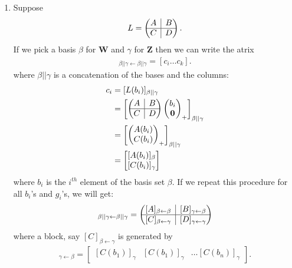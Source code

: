 \documentclass{book}
\theoremstyle{definition}
\newcommand{\W}{\mathbf{W}}
\newcommand{\Z}{\mathbf{Z}}
\newcommand{\rvline}{\hspace*{-\arraycolsep}\vline\hspace*{-\arraycolsep}}
\begin{document}
\begin{enumerate}
	
	\item Suppose 
	\begin{align*}
	L = \begin{pmatrix}
	A & \rvline & B\\
	\hline
	C & \rvline & D
	\end{pmatrix}.
	\end{align*}
	If we pick a basis $\beta$ for $\W$ and $\gamma$ for $\Z$ then we can write the atrix
	\begin{align*}
	[L]_{\beta||\gamma \leftarrow \beta||\gamma} = [c_i \dots c_k].
	\end{align*}
	where $\beta||\gamma$ is a concatenation of the bases and the columns:
	\begin{align*}
	c_i &= [L(b_i)]_{\beta||\gamma}\\
	&= \begin{bmatrix}
	\begin{pmatrix}
	A & \rvline & B\\
	\hline
	C & \rvline & D
	\end{pmatrix} \begin{pmatrix}
	b_i \\ \mathbf{0}
	\end{pmatrix}_+
	\end{bmatrix}_{\beta||\gamma} \\
	&= \begin{bmatrix}
	\begin{pmatrix}
	A(b_i)\\
	C(b_i)
	\end{pmatrix}_+
	\end{bmatrix}_{\beta||\gamma}\\
	&= \begin{bmatrix}
	[A(b_i)]_\beta\\
	[C(b_i)]_\gamma
	\end{bmatrix}
	\end{align*}
	where $b_i$ is the $i^{th}$ element of the basis set $\beta$. If we repeat this procedure for all $b_i$'s and $g_i$'s, we will get:
	\begin{align*}
	[L]_{\beta||\gamma \leftarrow \beta||\gamma} = 
	\begin{pmatrix}
	[A]_{\beta\leftarrow \beta} & \rvline & [B]_{\gamma\leftarrow \beta}\\
	\hline
	[C]_{\beta\leftarrow \gamma} & \rvline & [D]_{\gamma\leftarrow \gamma}
	\end{pmatrix}
	\end{align*}
	where a block, say $[C]_{\beta\leftarrow\gamma}$ is generated by
	\begin{align*}
	[C]_{\gamma\leftarrow\beta} = \begin{bmatrix}
	[C(b_1)]_\gamma & [C(b_1)]_\gamma & \dots [C(b_n)]_\gamma
	\end{bmatrix}.
	\end{align*}
	
\end{enumerate}
\end{document}
